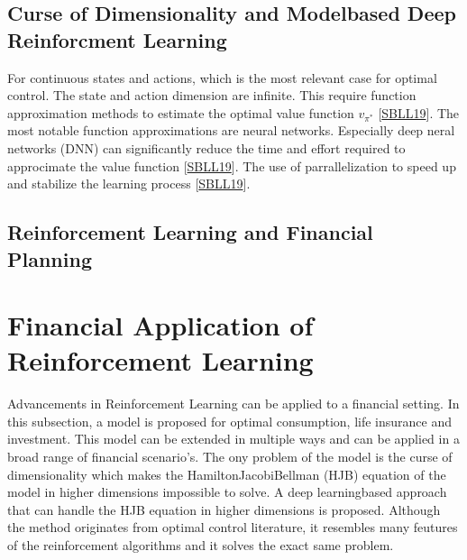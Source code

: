 \documentclass[letterpaper,10pt,english]{jupyterBook}
\begin{document}
\section{Curse of Dimensionality and Model\sphinxhyphen{}based Deep Reinforcment Learning}
\label{\detokenize{Reinforcement_learning:curse-of-dimensionality-and-model-based-deep-reinforcment-learning}}
\sphinxAtStartPar
For continuous states and actions, which is the most relevant case for optimal control. The state and action dimension are infinite. This require function approximation methods to estimate the optimal value function \(v_{\pi^*}\) {[}\hyperlink{cite.Discussion:id42}{SBLL19}{]}. The most notable function approximations are neural networks. Especially deep neral networks (DNN) can significantly reduce the time and effort required to approcimate the value function {[}\hyperlink{cite.Discussion:id42}{SBLL19}{]}. The use of parrallelization to speed up and stabilize the learning process {[}\hyperlink{cite.Discussion:id42}{SBLL19}{]}.


\section{Reinforcement Learning and Financial Planning}
\label{\detokenize{Reinforcement_learning:reinforcement-learning-and-financial-planning}}

\chapter{Financial Application of Reinforcement Learning}
\label{\detokenize{Financial_application:financial-application-of-reinforcement-learning}}\label{\detokenize{Financial_application::doc}}
\sphinxAtStartPar
Advancements in Reinforcement Learning can be applied to a financial setting. In this subsection, a model is proposed for optimal consumption, life insurance and investment. This model can be extended in multiple ways and can be applied in a broad range of financial scenario’s. The ony problem of the model is the curse of dimensionality which makes the Hamilton\sphinxhyphen{}Jacobi\sphinxhyphen{}Bellman (HJB) equation of the model in higher dimensions impossible to solve. A deep learning\sphinxhyphen{}based approach that can handle the HJB equation in higher dimensions is proposed. Although the method originates from optimal control literature, it resembles many feutures of the reinforcement algorithms and it solves the exact same problem.
\end{document}
